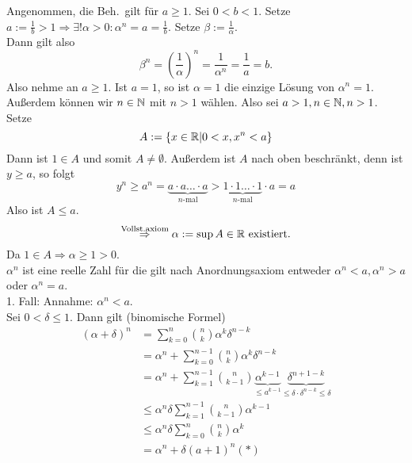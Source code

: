 \documentclass[../ana1.tex]{subfiles}
\begin{document}
\begin{bew}
	Angenommen, die Beh.\ gilt für \(a\geq 1\). Sei \(0 < b < 1\). Setze \(a :=\frac{1}{b}>1\Rightarrow \exists !\alpha>0:\alpha^n = a = \frac{1}{b}\). Setze \(\beta := \frac{1}{\alpha}\).\\
	Dann gilt also 
	\[ \beta^n = {\left(\frac{1}{\alpha}\right)}^n = \frac{1}{\alpha^n} = \frac{1}{a} = b.\]
	Also nehme an \(a\geq 1\). Ist \(a=1\), so ist \(\alpha = 1\) die einzige Lösung von \(\alpha^n = 1\). Außerdem können wir \(n\in\mathbb{N} \) mit \(n>1\) wählen. Also sei \(a>1,n\in\mathbb{N},n>1\). Setze
	\[ A := \{x\in\mathbb{R}|0<x, x^n<a\} \]
	Dann ist \(1\in A\) und somit \(A\neq\emptyset \). Außerdem ist \(A\) nach oben beschränkt, denn ist \(y \geq a\), so folgt
	\[ y^n \geq a^n = \underbrace{a \cdot a \ldots \cdot a}_{n\text{-mal}} > \underbrace{1 \cdot 1 \ldots \cdot 1}_{n\text{-mal}} \cdot a = a \]
	Also ist \(A \leq a\).
	\[ \overset{\text{Vollst.axiom}}{\Rightarrow} \alpha := \sup A \in\mathbb{R} \text{ existiert}.\]
	Da \(1\in A \Rightarrow \alpha \geq 1 > 0\).\\
	\(\alpha^n\) ist eine reelle Zahl für die gilt nach Anordnungsaxiom entweder \(\alpha^n <a, \alpha^n >a\) oder \(\alpha^n = a\).\\
	1. Fall: Annahme: \(\alpha^n <a\).\\
	Sei \(0<\delta\leq 1\). Dann gilt (binomische Formel)
	\begin{align*}
		{(\alpha + \delta)}^n & = \sum_{k=0}^{n} \binom{n}{k} \alpha^k\delta^{n-k}                                                                                                            \\
		                      & = \alpha^n + \sum_{k=0}^{n-1} \binom{n}{k} \alpha^k\delta^{n-k}                                                                                               \\
		                      & = \alpha^n + \sum_{k=1}^{n-1} \binom{n}{k-1} \underbrace{\alpha^{k-1}}_{\leq a^{k-1}}\underbrace{\delta^{n+1-k}}_{\leq \delta \cdot \delta^{n-k} \leq \delta} \\
		                      & \leq \alpha^n \delta \sum_{k=1}^{n-1} \binom{n}{k-1} \alpha^{k-1}                                                                                             \\
		                      & \leq \alpha^n \delta \sum_{k=0}^{n} \binom{n}{k} \alpha^{k}                                                                                                   \\
		                      & = \alpha^n + \delta {(a+1)}^n (*)

\end{align*}
\end{bew}
\end{document}
